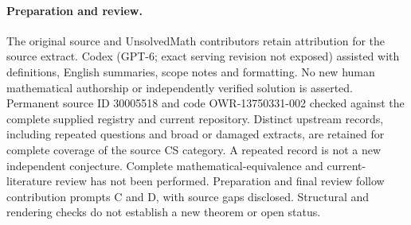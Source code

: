 \documentclass[11pt]{article}
\begin{document}
\paragraph{Preparation and review.}
The original source and UnsolvedMath contributors retain attribution for the source extract. Codex (GPT-6; exact serving revision not exposed) assisted with definitions, English summaries, scope notes and formatting. No new human mathematical authorship or independently verified solution is asserted. Permanent source ID 30005518 and code OWR-13750331-002 checked against the complete supplied registry and current repository. Distinct upstream records, including repeated questions and broad or damaged extracts, are retained for complete coverage of the source CS category. A repeated record is not a new independent conjecture. Complete mathematical-equivalence and current-literature review has not been performed. Preparation and final review follow contribution prompts C and D, with source gaps disclosed. Structural and rendering checks do not establish a new theorem or open status.
\label{end:30005518}
\end{document}
